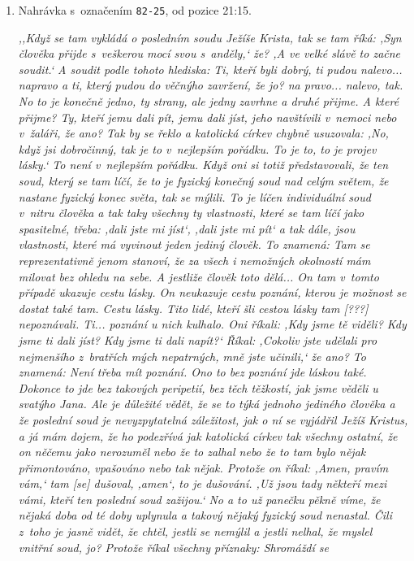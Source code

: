 \begin{enumerate}
\item{
Nahrávka s~označením \texttt{82-25}, od pozice 21:15.

\textit{%
,,Když se tam vykládá o posledním soudu Ježíše Krista, tak se tam říká: ,Syn
člověka přijde s~veškerou mocí svou s~anděly,` že? ,A ve velké slávě to začne
soudit.` A soudit podle tohoto hlediska: Ti, kteří byli dobrý, ti pudou
nalevo... napravo a ti, který pudou do věčnýho zavržení, že jo? na pravo...
nalevo, tak. No to je konečně jedno, ty strany, ale jedny zavrhne a druhé
přijme. A které přijme? Ty, kteří jemu dali pít, jemu dali jíst, jeho navštívili
v~nemoci nebo v~žaláři, že ano? Tak by se řeklo a katolická církev chybně
usuzovala: ,No, když jsi dobročinný, tak je to v~nejlepším pořádku. To je to, to
je projev lásky.` To není v~nejlepším pořádku. Když oni si totiž představovali,
že ten soud, který se tam líčí, že to je fyzický konečný soud nad celým světem,
že nastane fyzický konec světa, tak se mýlili. To je líčen individuální soud
v~nitru člověka a tak taky všechny ty vlastnosti, které se tam líčí jako
spasitelné, třeba: ,dali jste mi jíst`, ,dali jste mi pít` a tak dále, jsou
vlastnosti, které má vyvinout jeden jediný člověk. To znamená: Tam se
reprezentativně jenom stanoví, že za všech i nemožných okolností mám milovat bez
ohledu na sebe. A jestliže člověk toto dělá... On tam v~tomto případě ukazuje
cestu lásky. On neukazuje cestu poznání, kterou je možnost se dostat také tam.
Cestu lásky. Tito lidé, kteří šli cestou lásky tam [???] nepoznávali. Ti...
poznání u nich kulhalo. Oni říkali: ,Kdy jsme tě viděli? Kdy jsme ti dali jíst?
Kdy jsme ti dali napít?{}` Říkal: ,Cokoliv jste udělali pro nejmenšího z~bratřích
mých nepatrných, mně jste učinili,` že ano? To znamená: Není třeba mít poznání.
Ono to bez poznání jde láskou také. Dokonce to jde bez takových peripetií, bez
těch těžkostí, jak jsme věděli u svatýho Jana. Ale je důležité vědět, že se to
týká jednoho jediného člověka a že poslední soud je nevyzpytatelná záležitost,
jak o ní se vyjádřil Ježíš Kristus, a já mám dojem, že ho podezřívá jak
katolická církev tak všechny ostatní, že on něčemu jako nerozuměl nebo že to
zalhal nebo že to tam bylo nějak přimontováno, vpašováno nebo tak nějak. Protože
on říkal: ,Amen, pravím vám,` tam [se] dušoval, ,amen`, to je dušování. ,Už jsou
tady někteří mezi vámi, kteří ten poslední soud zažijou.` No a to už panečku
pěkně víme, že nějaká doba od té doby uplynula a takový nějaký fyzický soud
nenastal. Čili z~toho je jasně vidět, že chtěl, jestli se nemýlil a jestli
nelhal, že myslel vnitřní soud, jo? Protože říkal všechny příznaky: Shromáždí se
}}
\end{enumerate}
